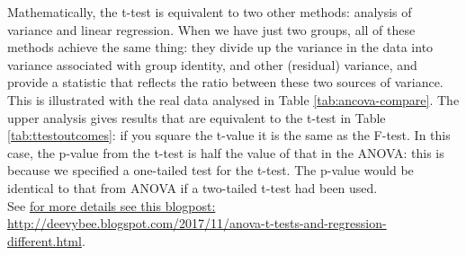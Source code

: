 \begin{tcolorbox}[colback=Black!5!lightgray,colframe=black!75!black,coltitle=white,title= { analysis of variance,  linear regression and t-test}]
Mathematically, the t-test is equivalent to two other methods: analysis of variance and linear regression. When we have just two groups, all of these methods achieve the same thing: they divide up the variance in the data into variance associated with group identity, and other (residual) variance, and provide a statistic that reflects the ratio between these two sources of variance. This is illustrated with the real data analysed in Table \ref{tab:ancova-compare}. The upper analysis gives results that are equivalent to the t-test in Table \ref{tab:ttestoutcomes}: if you square the t-value it is the same as the F-test. In this case, the p-value from the t-test is half the value of that in the ANOVA: this is because we specified a one-tailed test for the t-test. The p-value would be identical to that from ANOVA if a two-tailed t-test had been used.\\
See \href{http://deevybee.blogspot.com/2017/11/anova-t-tests-and-regression-different.html}{for more details see this blogpost: http://deevybee.blogspot.com/2017/11/anova-t-tests-and-regression-different.html}.
\end{tcolorbox}